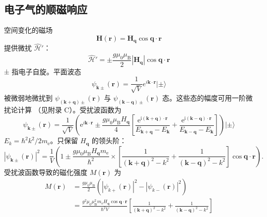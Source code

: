 \subsection{电子气的顺磁响应}

空间变化的磁场
\begin{equation*}
\mathbf{H}(\mathbf{r}) = \mathbf{H}_{\mathbf{q}}\cos\mathbf{q}\cdot\mathbf{r}\tag{7.67}
\end{equation*}
提供微扰 $\hat{\mathcal{H}}'$：
\begin{equation*}
\hat{\mathcal{H}}' = \pm\frac{g\mu_0\mu_{\mathrm{B}}}{2}|\mathbf{H}_{\mathbf{q}}|\cos\mathbf{q}\cdot\mathbf{r}\tag{7.68}
\end{equation*}
± 指电子自旋。平面波态
\begin{equation*}
\psi_{\mathbf{k}\pm}(\mathbf{r}) = \frac{1}{\sqrt{V}}e^{i\mathbf{k}\cdot\mathbf{r}}|\pm\rangle\tag{7.69}
\end{equation*}
被微弱地微扰到 $\psi_{(\mathbf{k}+\mathbf{q})\pm}(\mathbf{r})$ 与
$\psi_{(\mathbf{k}-\mathbf{q})\pm}(\mathbf{r})$ 态。这些态的幅度可用一阶微扰论计算
（见附录 C）。受扰波函数为
\begin{equation*}
\psi_{\mathbf{k}\pm}(\mathbf{r}) = \frac{1}{\sqrt{V}}\left(\mathrm{e}^{i\mathbf{k}\cdot\mathbf{r}} \pm \frac{g\mu_0\mu_{\mathrm{B}}H_{\mathbf{q}}}{4}\left[\frac{\mathrm{e}^{\mathrm{i}(\mathbf{k}+\mathbf{q})\cdot\mathbf{r}}}{E_{\mathbf{k}+\mathbf{q}}-E_{\mathbf{k}}} + \frac{\mathrm{e}^{\mathrm{i}(\mathbf{k}-\mathbf{q})\cdot\mathbf{r}}}{E_{\mathbf{k}-\mathbf{q}}-E_{\mathbf{k}}}\right]\right)|\pm\rangle\tag{7.70}
\end{equation*}
$E_k=\hbar^{2}k^{2}/2m_{\mathrm{e}}$。只保留 $H_{\mathbf{q}}$ 的领头阶：
\begin{equation*}
|\psi_{\mathbf{k}\pm}(\mathbf{r})|^{2} = \frac{1}{V}\left(1 \pm \frac{g\mu_0\mu_{\mathrm{B}}H_{\mathbf{q}}m_{\mathrm{e}}}{\hbar^{2}}\times\left[\frac{1}{(\mathbf{k}+\mathbf{q})^{2}-k^{2}} + \frac{1}{(\mathbf{k}-\mathbf{q})^{2}-k^{2}}\right]\cos\mathbf{q}\cdot\mathbf{r}\right).\tag{7.71}
\end{equation*}
受扰波函数导致的磁化强度 $M(\mathbf{r})$ 为
\begin{align*}
M(\mathbf{r}) &= \frac{g\mu_0\mu_{\mathrm{B}}}{2}(|\psi_{k+}(\mathbf{r})|^{2}-|\psi_{k-}(\mathbf{r})|^{2})\\
&= \frac{g^{2}\mu_0\mu_{\mathrm{B}}^{2}m_{\mathrm{e}}H_{\mathbf{q}}\cos\mathbf{q}\cdot\mathbf{r}}{\hbar^{2}V}\left[\frac{1}{(\mathbf{k}+\mathbf{q})^{2}-k^{2}} + \frac{1}{(\mathbf{k}-\mathbf{q})^{2}-k^{2}}\right]\tag{7.72}
\end{align*}

